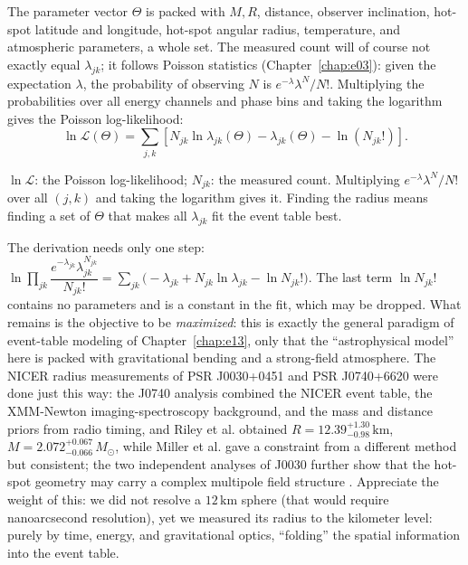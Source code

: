The parameter vector \(\Theta\) is packed with \(M,R\), distance, observer inclination, hot-spot latitude and longitude, hot-spot angular radius, temperature, and atmospheric parameters, a whole set. The measured count will of course not exactly equal \(\lambda_{jk}\); it follows Poisson statistics (Chapter~\ref{chap:e03}): given the expectation \(\lambda\), the probability of observing \(N\) is \(e^{-\lambda}\lambda^N/N!\). Multiplying the probabilities over all energy channels and phase bins and taking the logarithm gives the Poisson log-likelihood:
\begin{equation}
  \ln\mathcal{L}(\Theta)=
  \sum_{j,k}\left[
  N_{jk}\ln\lambda_{jk}(\Theta)-\lambda_{jk}(\Theta)-\ln(N_{jk}!)
  \right].
  \label{eq:e18-lnl}
\end{equation}
\begin{formulaexplain}
\(\ln\mathcal{L}\): the Poisson log-likelihood; \(N_{jk}\): the measured count. Multiplying \(e^{-\lambda}\lambda^N/N!\) over all \((j,k)\) and taking the logarithm gives it. Finding the radius means finding a set of \(\Theta\) that makes all \(\lambda_{jk}\) fit the event table best.
\end{formulaexplain}

The derivation needs only one step: \(\ln\prod_{jk}\dfrac{e^{-\lambda_{jk}}\lambda_{jk}^{N_{jk}}}{N_{jk}!}=\sum_{jk}\big(-\lambda_{jk}+N_{jk}\ln\lambda_{jk}-\ln N_{jk}!\big)\). The last term \(\ln N_{jk}!\) contains no parameters and is a constant in the fit, which may be dropped. What remains is the objective to be \emph{maximized}: this is exactly the general paradigm of event-table modeling of Chapter~\ref{chap:e13}, only that the ``astrophysical model'' here is packed with gravitational bending and a strong-field atmosphere. The NICER radius measurements of PSR J0030+0451 and PSR J0740+6620 were done just this way: the J0740 analysis combined the NICER event table, the XMM-Newton imaging-spectroscopy background, and the mass and distance priors from radio timing, and Riley et al. obtained \(R=12.39^{+1.30}_{-0.98}\,\mathrm{km}\), \(M=2.072^{+0.067}_{-0.066}\,M_\odot\), while Miller et al. gave a constraint from a different method but consistent; the two independent analyses of J0030 further show that the hot-spot geometry may carry a complex multipole field structure \citep{2019ApJ...887L..21R,2019ApJ...887L..24M,2021ApJ...918L..27R,2021ApJ...918L..28M}. Appreciate the weight of this: we did not resolve a \(12\,\mathrm{km}\) sphere (that would require nanoarcsecond resolution), yet we measured its radius to the kilometer level: purely by time, energy, and gravitational optics, ``folding'' the spatial information into the event table.


